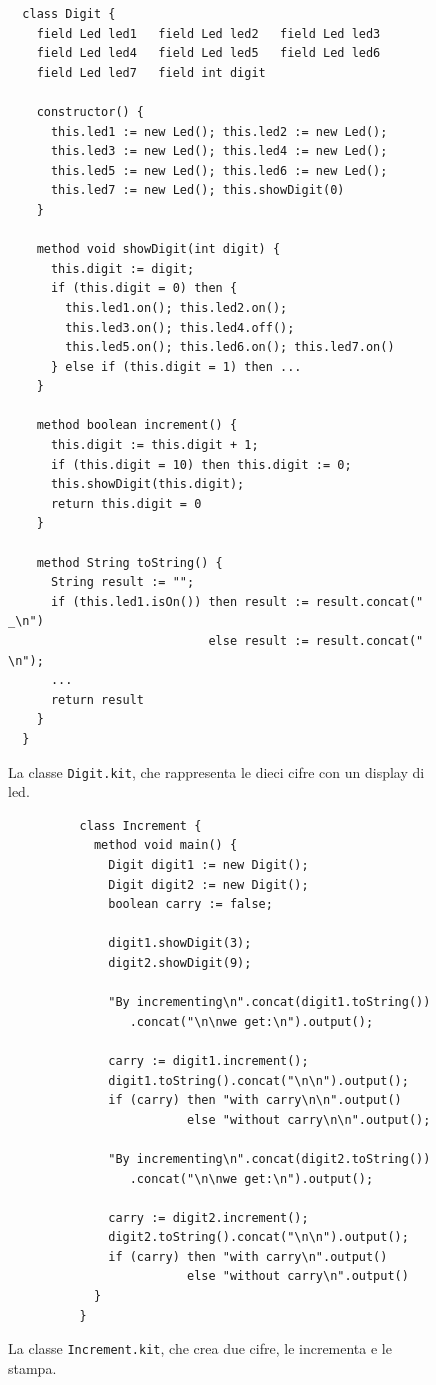 %
\begin{figure}[t]
\begin{verbatim}
  class Digit {
    field Led led1   field Led led2   field Led led3
    field Led led4   field Led led5   field Led led6
    field Led led7   field int digit

    constructor() {
      this.led1 := new Led(); this.led2 := new Led();
      this.led3 := new Led(); this.led4 := new Led();
      this.led5 := new Led(); this.led6 := new Led();
      this.led7 := new Led(); this.showDigit(0)
    }
 
    method void showDigit(int digit) {
      this.digit := digit;
      if (this.digit = 0) then {
        this.led1.on(); this.led2.on();
        this.led3.on(); this.led4.off();
        this.led5.on(); this.led6.on(); this.led7.on()
      } else if (this.digit = 1) then ...
    }

    method boolean increment() {
      this.digit := this.digit + 1;
      if (this.digit = 10) then this.digit := 0;
      this.showDigit(this.digit);
      return this.digit = 0
    }

    method String toString() {
      String result := "";
      if (this.led1.isOn()) then result := result.concat(" _\n")
                            else result := result.concat("  \n");
      ...
      return result
    }
  }
\end{verbatim}
\caption{La classe \texttt{Digit.kit}, che rappresenta le dieci cifre
con un display di led.}\label{fig:digit}
\end{figure}
%
\begin{figure}[t]
\begin{verbatim}
          class Increment {
            method void main() {
              Digit digit1 := new Digit();
              Digit digit2 := new Digit();
              boolean carry := false;

              digit1.showDigit(3);
              digit2.showDigit(9);

              "By incrementing\n".concat(digit1.toString())
                 .concat("\n\nwe get:\n").output();

              carry := digit1.increment();
              digit1.toString().concat("\n\n").output();
              if (carry) then "with carry\n\n".output()
                         else "without carry\n\n".output();

              "By incrementing\n".concat(digit2.toString())
                 .concat("\n\nwe get:\n").output();

              carry := digit2.increment();
              digit2.toString().concat("\n\n").output();
              if (carry) then "with carry\n".output()
                         else "without carry\n".output()
            }
          }
\end{verbatim}
\caption{La classe \texttt{Increment.kit}, che crea due cifre, le incrementa e le stampa.}\label{fig:increment}
\end{figure}
